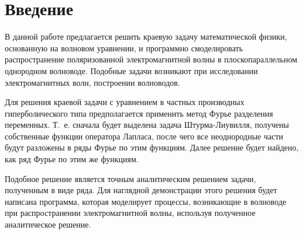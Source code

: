 \chapter*{Введение}

В данной работе предлагается решить краевую задачу математической физики, основанную на волновом уравнении, и программно смоделировать распространение поляризованной электромагнитной волны в плоскопараллельном однородном волноводе. Подобные задачи возникают при исследовании электромагнитных волн, построении волноводов.

Для решения краевой задачи с уравнением в частных производных гиперболического типа предполагается применить метод Фурье разделения переменных. Т.~е. сначала будет выделена задача Штурма-Лиувилля, получены собственные функции оператора Лапласа, после чего все неоднородные части будут разложены в ряды Фурье по этим функциям. Далее решение будет найдено, как ряд Фурье по этим же функциям.

Подобное решение является точным аналитическим решением задачи, полученным в виде ряда. Для наглядной демонстрации этого решения будет написана программа, которая моделирует процессы, возникающие в волноводе при распространении электромагнитной волны, используя полученное аналитическое решение.
